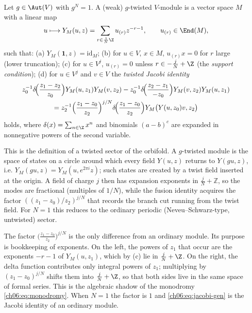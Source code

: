 \begin{definition}\label{ch06:def:dlm}
Let $g\in\Aut(V)$ with $g^N=1$.  A (weak) $g$-twisted $V$-module is a vector space $M$ with a
linear map
\begin{equation*}
  u\longmapsto Y_M(u,z)=\sum_{r\in\frac1N\Z}u_{(r)}z^{-r-1},\qquad u_{(r)}\in\End(M),
\end{equation*}
such that: (a) $Y_M(\mathbf 1,z)=\mathrm{id}_M$; (b) for $u\in V$, $x\in M$, $u_{(r)}x=0$ for $r$
large (lower truncation); (c) for $u\in V^j$, $u_{(r)}=0$ unless $r\in-\tfrac jN+\Z$ (the
\emph{support condition}); (d) for $u\in V^j$ and $v\in V$ the \emph{twisted Jacobi identity}
\begin{multline}\label{ch06:eq:jacobi-gen}
  z_0^{-1}\delta\!\Bigl(\frac{z_1-z_2}{z_0}\Bigr)Y_M(u,z_1)Y_M(v,z_2)
  -z_0^{-1}\delta\!\Bigl(\frac{z_2-z_1}{-z_0}\Bigr)Y_M(v,z_2)Y_M(u,z_1)\\
  = z_2^{-1}\Bigl(\frac{z_1-z_0}{z_2}\Bigr)^{j/N}\delta\!\Bigl(\frac{z_1-z_0}{z_2}\Bigr)
     Y_M\bigl(Y(u,z_0)v,z_2\bigr)
\end{multline}
holds, where $\delta(x)=\sum_{n\in\Z}x^n$ and binomials $(a-b)^c$ are expanded in nonnegative
powers of the second variable.
\end{definition}

\begin{physics}
This is the definition of a twisted sector of the orbifold. A $g$-twisted module is the space of states on a circle around which every field $Y(u,z)$ returns to $Y(gu,z)$, i.e. $Y_M(gu,z)=Y_M(u,e^{2\pi i}z)$; such states are created by a twist field inserted at the origin. A field of charge $j$ then has expansion exponents in $\tfrac jN+\mathbb Z$, so the modes are fractional (multiples of $1/N$), while the fusion identity acquires the factor $((z_1-z_0)/z_2)^{j/N}$ that records the branch cut running from the twist field. For $N=1$ this reduces to the ordinary periodic (Neveu--Schwarz-type, untwisted) sector.
\end{physics}

The factor $\bigl(\frac{z_1-z_0}{z_2}\bigr)^{j/N}$ is the only difference from an ordinary
module.  Its purpose is bookkeeping of exponents.  On the left, the powers of $z_1$ that occur are
the exponents $-r-1$ of $Y_M(u,z_1)$, which by (c) lie in $\tfrac jN+\Z$.  On the right, the delta
function contributes only integral powers of $z_1$; multiplying by $(z_1-z_0)^{j/N}$ shifts them
into $\tfrac jN+\Z$, so that both sides live in the same space of formal series.  This is the
algebraic shadow of the monodromy \eqref{ch06:eq:monodromy}.  When $N=1$ the factor is $1$ and
\eqref{ch06:eq:jacobi-gen} is the Jacobi identity of an ordinary module.

